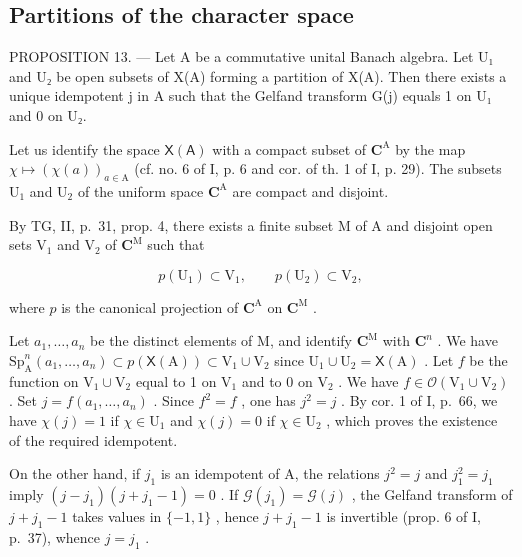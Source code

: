 \subsection{Partitions of the character space}

PROPOSITION 13. --- Let A be a commutative unital Banach algebra. Let U₁ and U₂ be open subsets of X(A) forming a partition of X(A). Then there exists a unique idempotent j in A such that the Gelfand transform G(j) equals 1 on U₁ and 0 on U₂.

Let us identify the space \(\mathsf{X}(\mathsf{A})\) with a compact subset of \(\mathbf{C}^{\mathrm{A}}\) by the map \(\chi \mapsto (\chi (a))_{a\in \mathrm{A}}\) (cf. no. 6 of I, p. 6 and cor. of th. 1 of I, p. 29). The subsets \(\mathrm{U}_1\) and \(\mathrm{U}_2\) of the uniform space \(\mathbf{C}^{\mathrm{A}}\) are compact and disjoint.

By TG, II, p.~31, prop. 4, there exists a finite subset M of A and disjoint open sets \(\mathrm{V}_{1}\) and \(\mathrm{V}_{2}\) of \(\mathbf{C}^{\mathrm{M}}\) such that

\[
p (\mathrm{U} _ {1}) \subset \mathrm{V} _ {1}, \qquad p (\mathrm{U} _ {2}) \subset \mathrm{V} _ {2},
\]

where \(p\) is the canonical projection of \(\mathbf{C}^{\mathrm{A}}\) on \(\mathbf{C}^{\mathrm{M}}\) .

Let \(a_1, \ldots, a_n\) be the distinct elements of M, and identify \(\mathbf{C}^{\mathrm{M}}\) with \(\mathbf{C}^n\) . We have \(\mathrm{Sp}_{\mathrm{A}}^{n}(a_{1}, \ldots, a_{n}) \subset p(\mathsf{X}(\mathrm{A})) \subset \mathrm{V}_{1} \cup \mathrm{V}_{2}\) since \(\mathrm{U}_{1} \cup \mathrm{U}_{2} = \mathsf{X}(\mathrm{A})\) . Let \(f\) be the function on \(\mathrm{V}_{1} \cup \mathrm{V}_{2}\) equal to 1 on \(\mathrm{V}_{1}\) and to 0 on \(\mathrm{V}_{2}\) . We have \(f \in \mathcal{O}(\mathrm{V}_{1} \cup \mathrm{V}_{2})\) . Set \(j = f(a_{1}, \ldots, a_{n})\) . Since \(f^{2} = f\) , one has \(j^{2} = j\) . By cor. 1 of I, p.~66, we have \(\chi(j) = 1\) if \(\chi \in \mathrm{U}_{1}\) and \(\chi(j) = 0\) if \(\chi \in \mathrm{U}_{2}\) , which proves the existence of the required idempotent.

On the other hand, if \(j_{1}\) is an idempotent of A, the relations \(j^{2} = j\) and \(j_{1}^{2} = j_{1}\) imply \((j - j_{1})(j + j_{1} - 1) = 0\) . If \(\mathcal{G}(j_{1}) = \mathcal{G}(j)\) , the Gelfand transform of \(j + j_{1} - 1\) takes values in \(\{-1, 1\}\) , hence \(j + j_{1} - 1\) is invertible (prop. 6 of I, p.~37), whence \(j = j_{1}\) .

